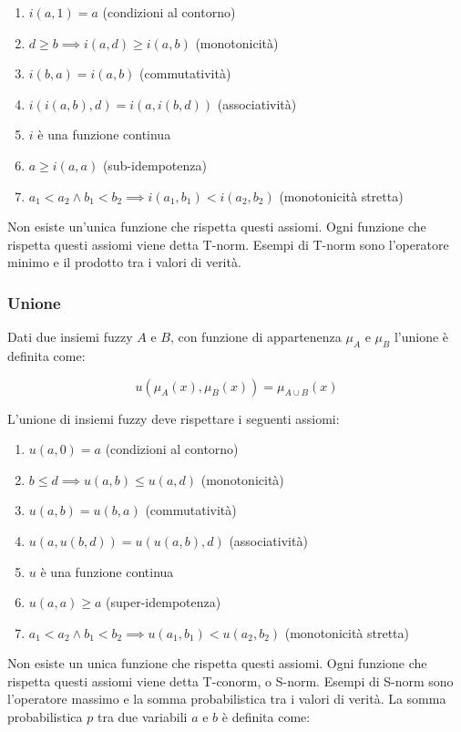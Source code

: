 \begin{enumerate}
 \item $i(a, 1)=a$ (condizioni al contorno)
 \item $d\geq b \implies  i(a,d)\geq i(a,b)$ (monotonicità)
 \item $i(b,a) = i(a,b)$ (commutatività)
 \item $i(i(a,b),d)=i(a,i(b,d))$ (associatività)
 \item $i$ è una funzione continua
 \item $a\geq i(a,a)$ (sub-idempotenza)
 \item $a_1<a_2 \wedge b_1<b_2\implies i(a_1,b_1)<i(a_2,b_2)$ (monotonicità stretta)
\end{enumerate}

Non esiste un'unica funzione che rispetta questi assiomi. Ogni funzione che rispetta questi assiomi viene detta T-norm.
Esempi di T-norm sono l'operatore minimo e il prodotto tra i valori di verità.

\subsubsection{Unione}

Dati due insiemi fuzzy $A$ e $B$, con funzione di appartenenza $\mu_A$ e $\mu_B$ l'unione è definita come:

\begin{equation*}
 u(\mu_A(x), \mu_B(x)) = \mu_{A\cup B}(x)
\end{equation*}

L'unione di insiemi fuzzy deve rispettare i seguenti assiomi:

\begin{enumerate}
 \item $u(a, 0)=a$ (condizioni al contorno)
 \item $b \leq d \implies u(a,b) \leq u(a,d)$ (monotonicità)
 \item $u(a,b) = u(b,a)$ (commutatività)
 \item $u(a,u(b,d)) = u(u(a,b),d)$ (associatività)
 \item $u$ è una funzione continua
 \item $u(a,a) \geq a$ (super-idempotenza)
 \item $a_1< a_2 \wedge b_1 < b_2 \implies u(a_1,b_1)<u(a_2,b_2)$ (monotonicità stretta)
\end{enumerate}

Non esiste un unica funzione che rispetta questi assiomi. Ogni funzione che rispetta questi assiomi viene detta T-conorm, o S-norm.
Esempi di S-norm sono l'operatore massimo e la somma probabilistica tra i valori di verità.
La somma probabilistica $p$ tra due variabili $a$  e $b$ è definita come:

